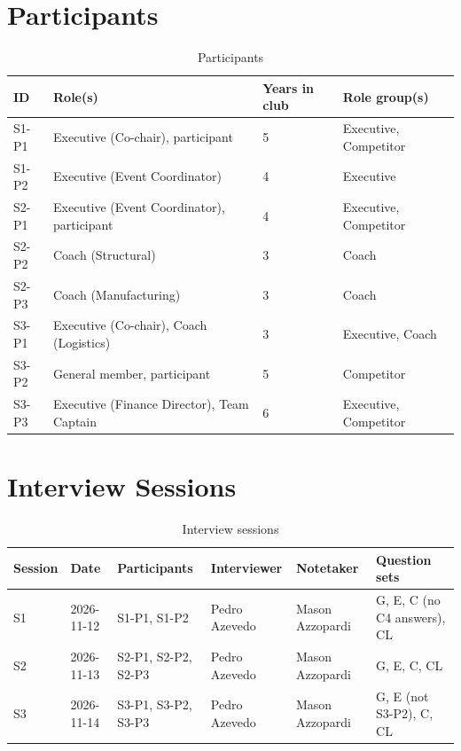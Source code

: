 \documentclass{article}
\begin{document}
\section{Participants}
\label{sec:participants}

\begin{table}[H]
\centering
\caption{Participants}
\label{tab:participants}
\small
\begin{tabularx}{\textwidth}{L{1.3cm} Y L{1.6cm} L{3.4cm}}
\toprule
\textbf{ID} & \textbf{Role(s)} & \textbf{Years in club} & \textbf{Role group(s)} \\
\midrule
S1-P1 & Executive (Co-chair), participant & 5 & Executive, Competitor \\
S1-P2 & Executive (Event Coordinator) & 4 & Executive \\
S2-P1 & Executive (Event Coordinator), participant & 4 & Executive, Competitor \\
S2-P2 & Coach (Structural) & 3 & Coach \\
S2-P3 & Coach (Manufacturing) & 3 & Coach \\
S3-P1 & Executive (Co-chair), Coach (Logistics) & 3 & Executive, Coach \\
S3-P2 & General member, participant & 5 & Competitor \\
S3-P3 & Executive (Finance Director), Team Captain & 6 & Executive, Competitor \\
\bottomrule
\end{tabularx}
\end{table}

\section{Interview Sessions}
\label{sec:sessions}

\begin{table}[H]
\centering
\caption{Interview sessions}
\label{tab:sessions}
\small
\begin{tabularx}{\textwidth}{@{}L{1.2cm} L{1.6cm} L{2.05cm} L{1.9cm} L{1.75cm} Y@{}}
\toprule
\textbf{Session} & \textbf{Date} & \textbf{Participants} & \textbf{Interviewer} & \textbf{Notetaker} & \textbf{Question sets} \\
\midrule
S1 & 2026-11-12 & S1-P1, S1-P2 & Pedro Azevedo & Mason Azzopardi & G, E, C (no C4 answers), CL \\
S2 & 2026-11-13 & S2-P1, S2-P2, S2-P3 & Pedro Azevedo & Mason Azzopardi & G, E, C, CL \\
S3 & 2026-11-14 & S3-P1, S3-P2, S3-P3 & Pedro Azevedo & Mason Azzopardi & G, E (not S3-P2), C, CL \\
\bottomrule
\end{tabularx}
\end{table}
\end{document}
